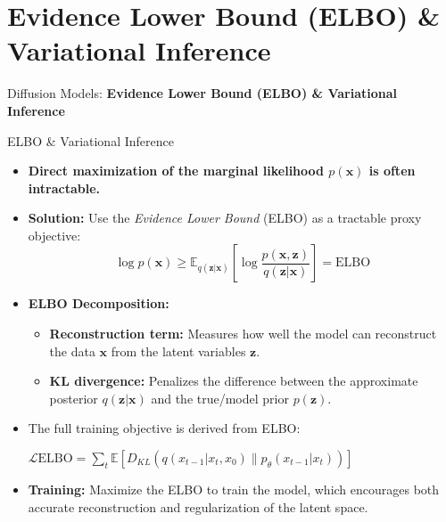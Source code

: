 \section{Evidence Lower Bound (ELBO) \& Variational Inference}
\begin{frame}{}
    \LARGE Diffusion Models: \textbf{Evidence Lower Bound (ELBO) \& Variational Inference}
\end{frame}

\begin{frame}{ELBO \& Variational Inference}
    \begin{itemize}
        \item \textbf{Direct maximization of the marginal likelihood $p(\mathbf{x})$ is often intractable.}
        \item<2-> \textbf{Solution:} Use the \textit{Evidence Lower Bound} (ELBO) as a tractable proxy objective:
        \begin{equation*}
            \log p(\mathbf{x}) \geq \mathbb{E}_{q(\mathbf{z}|\mathbf{x})} \left[ \log \frac{p(\mathbf{x}, \mathbf{z})}{q(\mathbf{z}|\mathbf{x})} \right] = \text{ELBO}
        \end{equation*}
        \item<3-> \textbf{ELBO Decomposition:}
        \begin{itemize}
            \item \textbf{Reconstruction term:} Measures how well the model can reconstruct the data $\mathbf{x}$ from the latent variables $\mathbf{z}$.
            \item \textbf{KL divergence:} Penalizes the difference between the approximate posterior $q(\mathbf{z}|\mathbf{x})$ and the true/model prior $p(\mathbf{z})$.
        \end{itemize}
        \item<4-> The full training objective is derived from ELBO:

        $\mathcal{L}\text{ELBO} = \sum_t \mathbb{E}[D_{KL}(q(x_{t-1}|x_t, x_0) \| p_\theta(x_{t-1}|x_t))]$

        \item<5-> \textbf{Training:} Maximize the ELBO to train the model, which encourages both accurate reconstruction and regularization of the latent space.
    \end{itemize}
\end{frame}